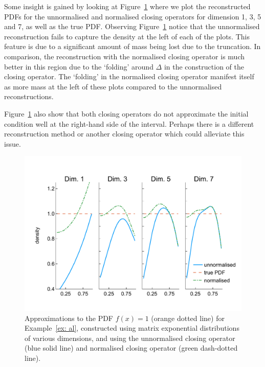 \begin{example}
Some insight is gained by looking at Figure~\ref{fig: pdf reconstructed} where we plot the reconstructed PDFs for the unnormalised and normalised closing operators for dimension 1, 3, 5 and 7, as well as the true PDF. Observing Figure~\ref{fig: pdf reconstructed} notice that the unnormalised reconstruction fails to capture the density at the left of each of the plots. This feature is due to a significant amount of mass being lost due to the truncation. In comparison, the reconstruction with the normalised closing operator is much better in this region due to the `folding' around \(\Delta\) in the construction of the closing operator. The `folding' in the normalised closing operator manifest itself as more mass at the left of these plots compared to the unnormalised reconstructions. %

Figure~\ref{fig: pdf reconstructed} also show that both closing operators do not approximate the initial condition well at the right-hand side of the interval. Perhaps there is a different reconstruction method or another closing operator which could alleviate this issue. 
\begin{figure}[h]
	\centering
	\includegraphics[width=\textwidth,trim={0cm 1.25cm 0cm 1.25cm},clip]{chapter6/figs/qbdrap_closing_vec/fun4/pdfs_formatted.pdf}
	\caption{Approximations to the PDF \(f(x)=1\) (orange dotted line) for Example~\ref{ex: al}, constructed using matrix exponential distributions of various dimensions, and using the unnormalised closing operator (blue solid line) and normalised closing operator (green dash-dotted line).}
	\label{fig: pdf reconstructed}
\end{figure} 
\exampleFloatBarrier
\end{example}

